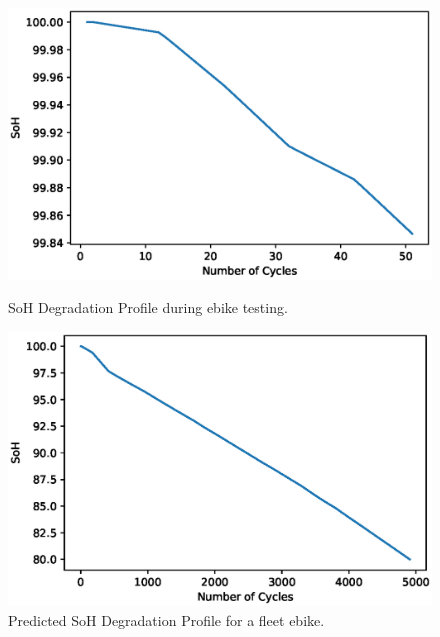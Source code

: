 \documentclass[a4paper, 10pt]{article}
\numberwithin{equation}{section}
\begin{document}
\begin{figure}[h]
\centering
\begin{minipage}{.5\textwidth}
  \centering
    \includegraphics[width=0.95\linewidth]{images/F7_Bat.eps}
    \caption{SoH Degradation Profile during ebike testing.}
    \label{fig:SoHcurrent}
\end{minipage}%
\begin{minipage}{.5\textwidth}
  \centering
    \includegraphics[width=0.95\linewidth]{images/F8_Predic.eps}
    \caption{Predicted SoH Degradation Profile for a fleet ebike.}
    \label{fig:SoHpre}
\end{minipage}
\end{figure}

\FloatBarrier
\end{document}

